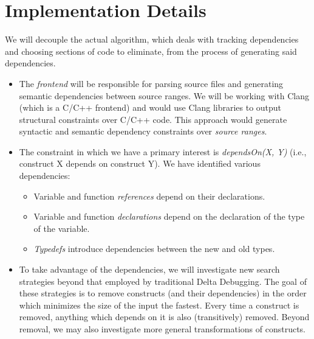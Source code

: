 \documentclass[11pt]{article}
\begin{document}
\section{Implementation Details}
We will decouple the actual algorithm, which deals with tracking dependencies
and choosing sections of code to eliminate, from the process of generating said
dependencies.

\begin{itemize}
\item The \emph{frontend} will be responsible for parsing source files and
  generating semantic dependencies between source ranges. We will be working
  with Clang (which is a C/C++ frontend) and would use Clang libraries to output
  structural constraints over C/C++ code.  This approach would generate
  syntactic and semantic dependency constraints over \emph{source ranges}.
\item The constraint in which we have a primary interest is \emph{dependsOn(X,
  Y)} (i.e., construct X depends on construct Y).  We have identified various
  dependencies:

\begin{itemize}
\item{Variable and function \emph{references} depend on their declarations.}
\item{Variable and function \emph{declarations} depend on the declaration of the
  type of the variable.}
\item{\emph{Typedefs} introduce dependencies between the new and old types.}
\end{itemize}

\item To take advantage of the dependencies, we will investigate new search
  strategies beyond that employed by traditional Delta Debugging.  The goal of
  these strategies is to remove constructs (and their dependencies) in the order
  which minimizes the size of the input the fastest.
  Every time a construct is removed, anything which depends on
  it is also (transitively) removed.  Beyond removal, we may also investigate
  more general transformations of constructs.%


\end{itemize}
\end{document}
